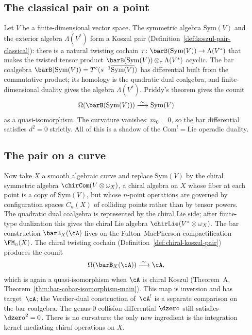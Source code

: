 \subsection{The classical pair on a point}

Let $V$ be a finite-dimensional vector space. The symmetric algebra
$\mathrm{Sym}(V)$ and the exterior algebra $\Lambda(V^*)$ form a
Koszul pair (Definition~\ref{def:koszul-pair-classical}): there is a
natural twisting cochain
$\tau\colon \barB(\mathrm{Sym}(V)) \to \Lambda(V^*)$ that makes the
twisted tensor product
$\barB(\mathrm{Sym}(V)) \otimes_\tau \Lambda(V^*)$ acyclic. The bar
coalgebra
$\barB(\mathrm{Sym}(V)) = T^c(s^{-1}\overline{\mathrm{Sym}(V)})$
has differential built from the commutative product; its homology is
the quadratic dual coalgebra, and finite-dimensional duality gives the
algebra $\Lambda(V^*)$. Priddy's theorem \cite{Priddy70} gives the
counit
\[
 \Omega(\barB(\mathrm{Sym}(V))) \xrightarrow{\;\sim\;} \mathrm{Sym}(V)
\]
as a quasi-isomorphism. The curvature vanishes: $m_0 = 0$, so the bar
differential satisfies $d^2 = 0$ strictly. All of this is a
shadow of the $\mathrm{Com}^! = \mathrm{Lie}$ operadic duality.

\subsection{The pair on a curve}

Now take $X$ a smooth algebraic curve and replace
$\mathrm{Sym}(V)$ by the chiral symmetric algebra
$\chirCom(V \otimes \omega_X)$, a chiral algebra on $X$ whose fiber
at each point is a copy of $\mathrm{Sym}(V)$, but whose
$n$-point operations are governed by configuration spaces
$\overline{C}_n(X)$ of colliding points rather than by tensor powers.
The quadratic dual coalgebra is represented by the chiral Lie side;
after finite-type dualization this gives the chiral Lie algebra
$\chirLie(V^* \otimes \omega_X)$.  The bar construction
$\barB_X(\cA)$ lives on the Fulton--MacPherson compactification
$\FM_n(X)$. The chiral twisting cochain
(Definition~\ref{def:chiral-koszul-pair}) produces the counit
\[
 \Omega(\barB_X(\cA)) \xrightarrow{\;\sim\;} \cA,
\]
which is again a quasi-isomorphism when $\cA$ is chiral Koszul
(Theorem~A, Theorem~\ref{thm:bar-cobar-isomorphism-main}).  This
map is inversion and has target~$\cA$; the Verdier-dual construction
of~$\cA^!$ is a separate comparison on the bar coalgebra.  The genus-$0$ collision differential $\dzero$ still satisfies
$\dzero^2 = 0$. There is no curvature; the only new ingredient is
the integration kernel mediating chiral operations on $X$.

